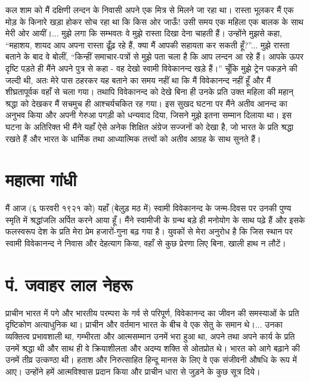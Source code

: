 कल शाम को मैं दक्षिणी लन्दन के निवासी अपने एक मित्र से मिलने जा रहा था। रास्ता भूलकर मैं एक मोड़ के किनारे खड़ा होकर सोच रहा था कि किस ओर जाऊँ! उसी समय एक महिला एक बालक के साथ मेरी ओर आयीं।... मुझे लगा कि सम्भवतः वे मुझे रास्ता दिखा देना चाहती हैं। उन्होंने मुझसे कहा, “महाशय, शायद आप अपना रास्ता ढूँढ़ रहे हैं, क्या मैं आपकी सहायता कर सकती हूँ?”... मुझे रास्ता बताने के बाद वे बोलीं, “किन्हीं समाचार-पत्रों से मुझे पता चला है कि आप लन्दन आ रहे हैं। आपके ऊपर दृष्टि पड़ते ही मैंने अपने पुत्र से कहा - वह देखो स्वामी विवेकानन्द खड़े हैं।” चूँकि मुझे ट्रेन पकड़ने की जल्दी थी, अतः मेरे पास ठहरकर यह बताने का समय नहीं था कि मैं विवेकानन्द नहीं हूँ और मैं शीघ्रतापूर्वक वहाँ से चला गया। तथापि विवेकानन्द को देखे बिना ही उनके प्रति उक्त महिला की महान् श्रद्धा को देखकर मैं सचमुच ही आश्चर्यचकित रह गया। इस सुखद घटना पर मैंने अतीव आनन्द का अनुभव किया और अपनी गेरुआ पगड़ी को धन्यवाद दिया, जिसने मुझे इतना सम्मान दिलाया था। इस घटना के अतिरिक्त भी मैंने यहाँ ऐसे अनेक शिक्षित अंग्रेज सज्जनों को देखा है, जो भारत के प्रति श्रद्धा रखते हैं और भारत के धार्मिक तथा आध्यात्मिक तत्त्वों को अतीव आग्रह के साथ सुनते हैं।


\section*{महात्मा गांधी}


मैं आज (६ फरवरी १९२१ को) यहाँ (बेलुड़ मठ में) स्वामी विवेकानन्द के जन्म-दिवस पर उनकी पुण्य स्मृति में श्रद्धांजलि अर्पित करने आया हूँ। मैंने स्वामीजी के ग्रन्थ बड़े ही मनोयोग के साथ पढ़े हैं और इसके फलस्वरूप देश के प्रति मेरा प्रेम हजारों-गुना बढ़ गया है। युवकों से मेरा अनुरोध है कि जिस स्थान पर स्वामी विवेकानन्द ने निवास और देहत्याग किया, वहाँ से कुछ प्रेरणा लिए बिना, खाली हाथ न लौटें।


\section*{पं. जवाहर लाल नेहरू}


प्राचीन भारत में पगे और भारतीय परम्परा के गर्व से परिपूर्ण, विवेकानन्द का जीवन की समस्याओं के प्रति दृष्टिकोण अत्याधुनिक था। प्राचीन और वर्तमान भारत के बीच वे एक सेतु के समान थे।... उनका व्यक्तित्व प्रभावशाली था, गम्भीरता और आत्मसम्मान उनमें भरा हुआ था, अपने तथा अपने कार्य के प्रति उनमें श्रद्धा थी और साथ ही वे क्रियाशीलता और अदम्य शक्ति से ओतप्रोत थे। भारत को आगे बढ़ाने की उनमें तीव्र उत्कण्ठा थी। हताश और निरुत्साहित हिन्दू मानस के लिए वे एक संजीवनी औषधि के रूप में आए। उन्होंने हमें आत्मविश्वास प्रदान किया और प्राचीन धारा से जुड़ने के कुछ सूत्र दिये। 

